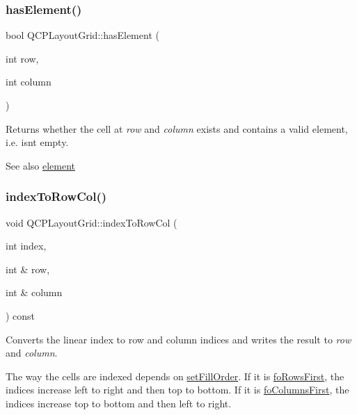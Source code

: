 \subsubsection{\texorpdfstring{has\+Element()}{hasElement()}}
{\footnotesize\ttfamily bool Q\+C\+P\+Layout\+Grid\+::has\+Element (\begin{DoxyParamCaption}\item[{int}]{row,  }\item[{int}]{column }\end{DoxyParamCaption})}

Returns whether the cell at {\itshape row} and {\itshape column} exists and contains a valid element, i.\+e. isn\textquotesingle{}t empty.

\begin{DoxySeeAlso}{See also}
\hyperlink{classQCPLayoutGrid_a602b426609b4411cf6a93c3ddf3a381a}{element} 
\end{DoxySeeAlso}
\mbox{\label{classQCPLayoutGrid_a577223db920e2acb34bc1091080c76d1}} 
\subsubsection{\texorpdfstring{index\+To\+Row\+Col()}{indexToRowCol()}}
{\footnotesize\ttfamily void Q\+C\+P\+Layout\+Grid\+::index\+To\+Row\+Col (\begin{DoxyParamCaption}\item[{int}]{index,  }\item[{int \&}]{row,  }\item[{int \&}]{column }\end{DoxyParamCaption}) const}

Converts the linear index to row and column indices and writes the result to {\itshape row} and {\itshape column}.

The way the cells are indexed depends on \hyperlink{classQCPLayoutGrid_affc2f3cfd22f28698c5b29b960d2a391}{set\+Fill\+Order}. If it is \hyperlink{classQCPLayoutGrid_a7d49ee08773de6b2fd246edfed353ccaa0202730954e26c474cc820164aedce3e}{fo\+Rows\+First}, the indices increase left to right and then top to bottom. If it is \hyperlink{classQCPLayoutGrid_a7d49ee08773de6b2fd246edfed353ccaac4cb4b796ec4822d5894b47b51627fb3}{fo\+Columns\+First}, the indices increase top to bottom and then left to right.


